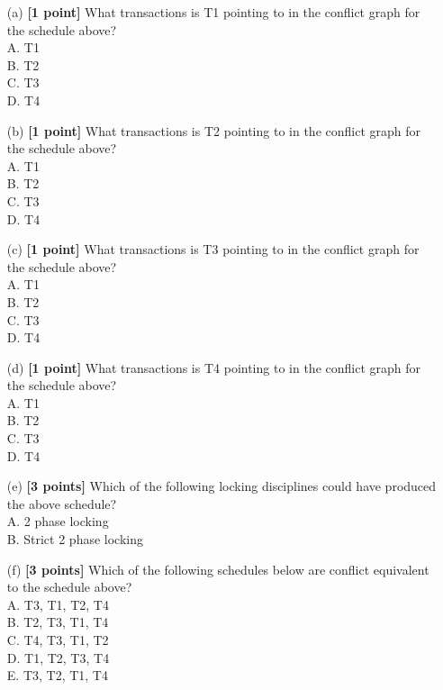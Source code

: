 \documentclass[10pt]{article}
\begin{document}
\begin{itemize}
	\item[(a)] \textbf{[1 point]} What transactions is T1 pointing to in the conflict graph for the schedule above?\\
	      A. T1\\
	      B. T2\\
	      C. T3\\
	      D. T4

	\item[(b)] \textbf{[1 point]} What transactions is T2 pointing to in the conflict graph for the schedule above?\\
	      A. T1\\
	      B. T2\\
	      C. T3\\
	      D. T4

	\item[(c)] \textbf{[1 point]} What transactions is T3 pointing to in the conflict graph for the schedule above? \\
	      A. T1\\
	      B. T2\\
	      C. T3\\
	      D. T4

	\item[(d)] \textbf{[1 point]} What transactions is T4 pointing to in the conflict graph for the schedule above? \\
	      A. T1\\
	      B. T2\\
	      C. T3\\
	      D. T4

	\item[(e)] \textbf{[3 points]} Which of the following locking disciplines could have produced the above schedule?\\
	      A. 2 phase locking\\
	      B. Strict 2 phase locking

	\item[(f)] \textbf{[3 points]} Which of the following schedules below are conflict equivalent to the schedule above?\\
	      A. T3, T1, T2, T4\\
	      B. T2, T3, T1, T4\\
	      C. T4, T3, T1, T2\\
	      D. T1, T2, T3, T4\\
	      E. T3, T2, T1, T4

\end{itemize}
\end{document}

